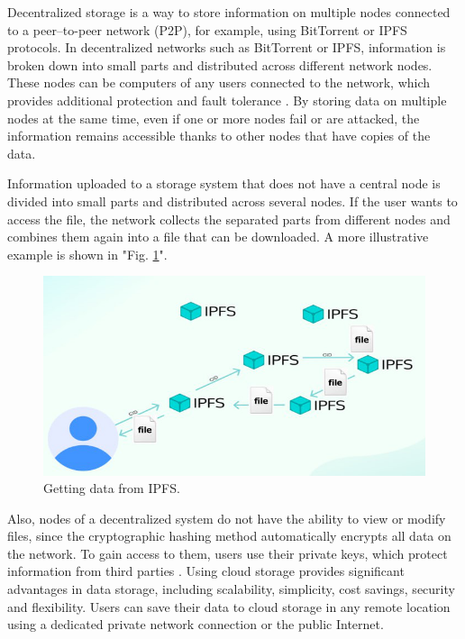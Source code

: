 \documentclass[10pt,conference,a4paper]{IEEEtran_EDM}
\begin{document}
Decentralized storage is a way to store information on multiple nodes connected to a peer–to-peer network (P2P), for example, using BitTorrent or IPFS \cite{IPFS} protocols.
In decentralized networks such as BitTorrent or IPFS, information is broken down into small parts and distributed across different network nodes.
These nodes can be computers of any users connected to the network, which provides additional protection and fault tolerance \cite{Anisimov}.
By storing data on multiple nodes at the same time, even if one or more nodes fail or are attacked, the information remains accessible thanks to other nodes that have copies of the data.

Information uploaded to a storage system that does not have a central node is divided into small parts and distributed across several nodes. If the user wants to access the file, the network collects the separated parts from different nodes and combines them again into a file that can be downloaded. A more illustrative example is shown in "Fig. \ref{data_IPFS}".

\begin{figure}[htbp]
\centerline{\includegraphics[scale=0.71]{fig1.png}}
\caption{Getting data from IPFS.}
\label{data_IPFS}
\end{figure}

Also, nodes of a decentralized system do not have the ability to view or modify files, since the cryptographic hashing method automatically encrypts all data on the network.
To gain access to them, users use their private keys, which protect information from third parties \cite{Web3Browsers}.
Using cloud storage provides significant advantages in data storage, including scalability, simplicity, cost savings, security and flexibility.
Users can save their data to cloud storage in any remote location using a dedicated private network connection or the public Internet.
\end{document}
